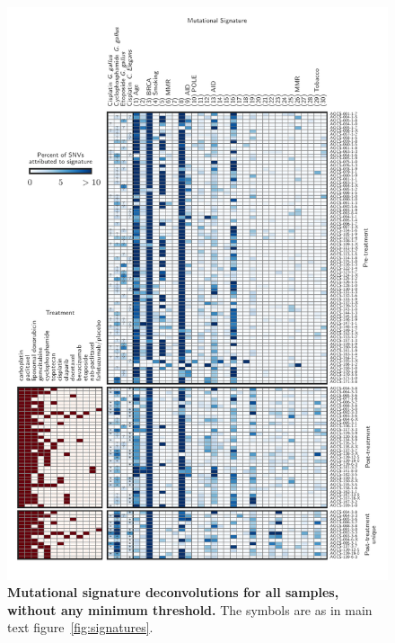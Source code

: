 \begin{figure}
\centering
\includegraphics[scale=1.0]{figures/supplementary_signatures_no_cutoff.pdf}
\caption{\textbf{Mutational signature deconvolutions for all samples, without any minimum threshold.} The symbols are as in main text figure~\ref{fig:signatures}.}
\label{fig:supplementary_signatures_no_cutoff.pdf}
\end{figure}

\FloatBarrier
